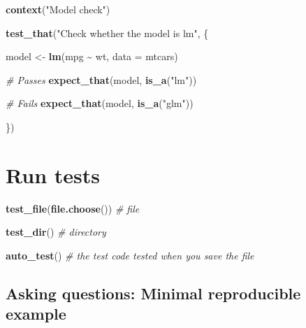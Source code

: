 \documentclass[
]{book}
\newenvironment{Shaded}{\begin{snugshade}}{\end{snugshade}}
\newcommand{\AttributeTok}[1]{\textcolor[rgb]{0.13,0.29,0.53}{#1}}
\newcommand{\CommentTok}[1]{\textcolor[rgb]{0.56,0.35,0.01}{\textit{#1}}}
\newcommand{\FunctionTok}[1]{\textcolor[rgb]{0.13,0.29,0.53}{\textbf{#1}}}
\newcommand{\NormalTok}[1]{#1}
\newcommand{\OtherTok}[1]{\textcolor[rgb]{0.56,0.35,0.01}{#1}}
\newcommand{\SpecialCharTok}[1]{\textcolor[rgb]{0.81,0.36,0.00}{\textbf{#1}}}
\newcommand{\StringTok}[1]{\textcolor[rgb]{0.31,0.60,0.02}{#1}}
\begin{document}
\begin{Shaded}
\begin{Highlighting}[]
\FunctionTok{context}\NormalTok{(}\StringTok{"Model check"}\NormalTok{)}

\FunctionTok{test\_that}\NormalTok{(}\StringTok{"Check whether the model is lm"}\NormalTok{, \{}

\NormalTok{  model }\OtherTok{\textless{}{-}} \FunctionTok{lm}\NormalTok{(mpg }\SpecialCharTok{\textasciitilde{}}\NormalTok{ wt, }\AttributeTok{data =}\NormalTok{ mtcars)}

  \CommentTok{\# Passes}
  \FunctionTok{expect\_that}\NormalTok{(model, }\FunctionTok{is\_a}\NormalTok{(}\StringTok{"lm"}\NormalTok{))}

  \CommentTok{\# Fails}
  \FunctionTok{expect\_that}\NormalTok{(model, }\FunctionTok{is\_a}\NormalTok{(}\StringTok{"glm"}\NormalTok{))}

\NormalTok{\})}
\end{Highlighting}
\end{Shaded}

\section{Run tests}\label{run-tests}

\begin{Shaded}
\begin{Highlighting}[]
\FunctionTok{test\_file}\NormalTok{(}\FunctionTok{file.choose}\NormalTok{()) }\CommentTok{\# file}

\FunctionTok{test\_dir}\NormalTok{() }\CommentTok{\# directory}

\FunctionTok{auto\_test}\NormalTok{() }\CommentTok{\# the test code tested when you save the file}
\end{Highlighting}
\end{Shaded}

\subsection{Asking questions: Minimal reproducible example}\label{asking-questions-minimal-reproducible-example}
\end{document}
